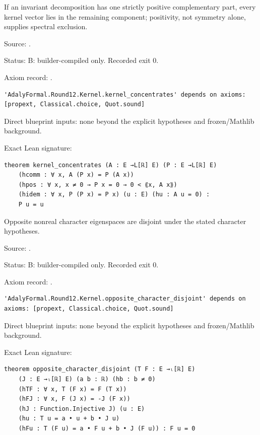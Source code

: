 \begin{theorem}[bp-337]
\label{bp-337}
\uses{}
\leanok
If an invariant decomposition has one strictly positive complementary part, every kernel vector lies in the remaining component; positivity, not symmetry alone, supplies spectral exclusion.

\par Source: \texttt{}.
\par Status: B: builder-compiled only. Recorded exit 0.
\par Axiom record: \texttt{}.
\begin{verbatim}
'AdalyFormal.Round12.Kernel.kernel_concentrates' depends on axioms: [propext, Classical.choice, Quot.sound]
\end{verbatim}
\par Direct blueprint inputs: none beyond the explicit hypotheses and frozen/Mathlib background.
\par Exact Lean signature:
\begin{verbatim}
theorem kernel_concentrates (A : E →L[ℝ] E) (P : E →L[ℝ] E)
    (hcomm : ∀ x, A (P x) = P (A x))
    (hpos : ∀ x, x ≠ 0 → P x = 0 → 0 < ⟪x, A x⟫)
    (hidem : ∀ x, P (P x) = P x) (u : E) (hu : A u = 0) :
    P u = u
\end{verbatim}
\end{theorem}

\begin{theorem}[bp-338]
\label{bp-338}
\uses{}
\leanok
Opposite nonreal character eigenspaces are disjoint under the stated character hypotheses.

\par Source: \texttt{}.
\par Status: B: builder-compiled only. Recorded exit 0.
\par Axiom record: \texttt{}.
\begin{verbatim}
'AdalyFormal.Round12.Kernel.opposite_character_disjoint' depends on axioms: [propext, Classical.choice, Quot.sound]
\end{verbatim}
\par Direct blueprint inputs: none beyond the explicit hypotheses and frozen/Mathlib background.
\par Exact Lean signature:
\begin{verbatim}
theorem opposite_character_disjoint (T F : E →ₗ[ℝ] E)
    (J : E →ₗ[ℝ] E) (a b : ℝ) (hb : b ≠ 0)
    (hTF : ∀ x, T (F x) = F (T x))
    (hFJ : ∀ x, F (J x) = -J (F x))
    (hJ : Function.Injective J) (u : E)
    (hu : T u = a • u + b • J u)
    (hFu : T (F u) = a • F u + b • J (F u)) : F u = 0
\end{verbatim}
\end{theorem}

